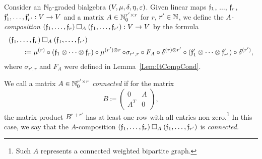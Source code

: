 \documentclass[\MainFolder/Text.tex]{subfiles}
\begin{document}
\begin{Definition}\label{Def:ConComp}
Consider an $\mathbb{N}_0$-graded bialgebra $(V,\mu,\delta,\eta,\varepsilon)$. Given linear maps $\mathfrak{f}_1$, $\dotsc$, $\mathfrak{f}_r$, $\mathfrak{f}_1', \dotsc, \mathfrak{f}_{r'}': V \rightarrow V$ and a matrix $A\in \mathbb{N}_0^{r'\times r}$ for $r$, $r'\in \mathbb{N}$, we define the \emph{$A$-composition} $(\MVMorF_1,\dotsc,\MVMorF_r)\SquareComp_A(\MVMorF_1,\dotsc,\MVMorF_{r'}): V \rightarrow V$ by the formula
\begin{align*}
&(\MVMorF_1,\dotsc,\MVMorF_r)\SquareComp_A(\MVMorF_1,\dotsc,\MVMorF_{r'}) \\
&\qquad\coloneqq \MVProd^{(r)}\circ(\MVMorF_1 \otimes \dotsb \otimes \MVMorF_r)\circ \Prod^{(r')\otimes r} \circ  \sigma_{r',r}\circ F_A \circ \MVCoProd^{(r)\otimes r'} \circ (\MVMorF_1' \otimes \dotsb \otimes \MVMorF_{r'}')\circ\MVCoProd^{(r')},
\end{align*}
where $\sigma_{r',r}$ and $F_A$ were defined in Lemma~\ref{Lem:ItCompCond}.

We call a matrix $A\in\mathbb{N}_0^{r'\times r}$ \emph{connected} if for the matrix
\[ B \coloneqq \begin{pmatrix} 0 & A \\ A^T & 0 \end{pmatrix}, \]
the matrix product $B^{r+r'}$ has at least one row with all entries non-zero.\footnote{Such $A$ represents a connected weighted bipartite graph.} In this case, we say that the $A$-composition $(\MVMorF_1,\dotsc,\MVMorF_r)\SquareComp_A(\MVMorF_1,\dotsc,\MVMorF_{r'})$ is \emph{connected.}


\end{Definition}
\end{document}

